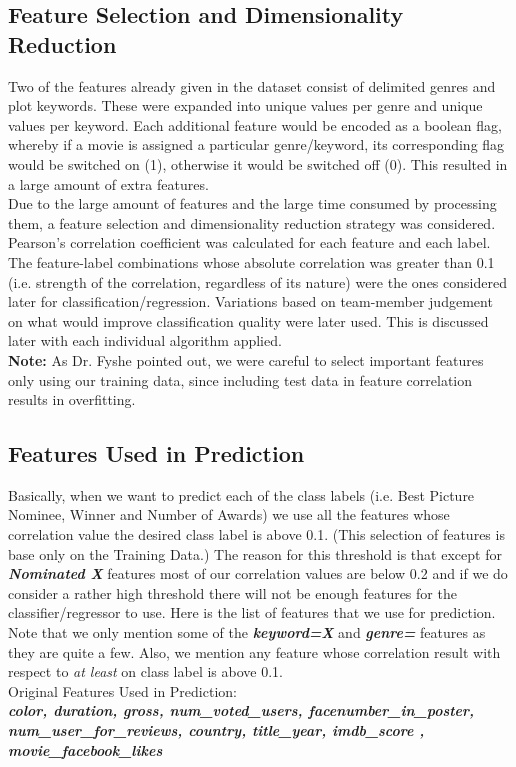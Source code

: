 \documentclass[journal,transmag]{IEEEtran}
\begin{document}
\subsection{Feature Selection and Dimensionality Reduction}
Two of the features already given in the dataset consist of delimited genres and plot keywords. These were expanded into unique values per genre and unique values per keyword. Each additional feature would be encoded as a boolean flag, whereby if a movie is assigned a particular genre/keyword, its corresponding flag would be switched on (1), otherwise it would be switched off (0). This resulted in a large amount of extra features.\\
Due to the large amount of features and the large time consumed by processing them, a feature selection and dimensionality reduction strategy was considered. Pearson’s correlation coefficient was calculated for each feature and each label. The feature-label combinations whose absolute correlation was greater than 0.1 (i.e. strength of the correlation, regardless of its nature) were the ones considered later for classification/regression. Variations based on team-member judgement on what would improve classification quality were later used. This is discussed later with each individual algorithm applied.\\
\textbf{Note:} As Dr. Fyshe pointed out, we were careful to select important features only using our training data, since including test data in feature correlation results in overfitting. \\

\subsection{Features Used in Prediction}
Basically, when we want to predict each of the class labels (i.e. Best Picture Nominee, Winner and Number of Awards) we use all the features whose correlation value the desired class label is above 0.1. (This selection of features is base only on the Training Data.) The reason for this threshold is that except for \textbf{\textit{Nominated X}} features most of our correlation values are below 0.2 and if we do consider a rather high threshold there will not be enough features for the classifier/regressor to use. Here is the list of features that we use for prediction. Note that we only mention some of the \textbf{\textit{keyword=X}} and \textbf{\textit{genre=}} features as they are quite a few. Also, we mention any feature whose correlation result with respect to \textit{at least} on class label is above 0.1.\\
Original Features Used in Prediction:\\
\textit{\textbf{ color, duration,	gross,	num\_voted\_users, 	facenumber\_in\_poster,	num\_user\_for\_reviews,	country,	title\_year,	imdb\_score	, movie\_facebook\_likes}} \\
\end{document}
